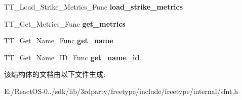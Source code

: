\begin{DoxyCompactItemize}
\mbox{\label{struct_s_f_n_t___interface___a285149d0d4f00f2b862e3db45205cfa0}} 
T\+T\+\_\+\+Load\+\_\+\+Strike\+\_\+\+Metrics\+\_\+\+Func {\bfseries load\+\_\+strike\+\_\+metrics}
\item 
\mbox{\label{struct_s_f_n_t___interface___a32ceff5842782c1cf7d7992e40cc858e}} 
T\+T\+\_\+\+Get\+\_\+\+Metrics\+\_\+\+Func {\bfseries get\+\_\+metrics}
\item 
\mbox{\label{struct_s_f_n_t___interface___aebd27b200f47621f290e21a8cd63b8dc}} 
T\+T\+\_\+\+Get\+\_\+\+Name\+\_\+\+Func {\bfseries get\+\_\+name}
\item 
\mbox{\label{struct_s_f_n_t___interface___ade2f4814b11eb72d9bc9d4217d146510}} 
T\+T\+\_\+\+Get\+\_\+\+Name\+\_\+\+I\+D\+\_\+\+Func {\bfseries get\+\_\+name\+\_\+id}
\end{DoxyCompactItemize}


该结构体的文档由以下文件生成\+:\begin{DoxyCompactItemize}
\item 
E\+:/\+React\+O\+S-\/0../sdk/lib/3rdparty/freetype/include/freetype/internal/sfnt.\+h\end{DoxyCompactItemize}

